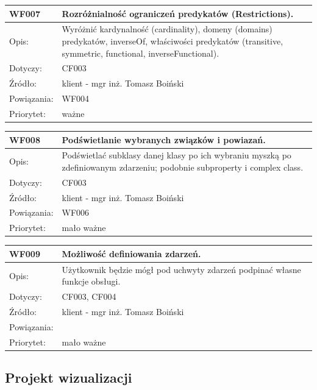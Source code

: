 \documentclass[a4paper,10pt]{article}
\begin{document}
\begin{tabular}{|p{3cm}|p{9cm}|} \hline

WF007 & Rozróżnialność ograniczeń predykatów (Restrictions). \\ \hline
Opis: & Wyróżnić kardynalność (cardinality), domeny (domains) predykatów, inverseOf, właściwości predykatów (transitive, symmetric, functional, inverseFunctional). \\ \hline
Dotyczy: &  CF003\\ \hline
Źródło: &  klient - mgr inż. Tomasz Boiński \\ \hline
Powiązania: & WF004\\ \hline
Priorytet: & ważne \\ \hline

\end{tabular}


\begin{tabular}{|p{3cm}|p{9cm}|} \hline

WF008 &  Podświetlanie wybranych związków i powiazań.\\ \hline
Opis: &   Podświetlać subklasy danej klasy po ich wybraniu myszką po zdefiniowanym zdarzeniu; podobnie subproperty i complex class. \\ \hline
Dotyczy: &  CF003\\ \hline
Źródło: &  klient - mgr inż. Tomasz Boiński \\ \hline
Powiązania: & WF006\\ \hline
Priorytet: & mało ważne \\ \hline

\end{tabular}


\begin{tabular}{|p{3cm}|p{9cm}|} \hline

WF009 & Możliwość definiowania zdarzeń. \\ \hline
Opis: &   Użytkownik będzie mógł pod uchwyty zdarzeń podpinać własne funkcje obsługi. \\ \hline
Dotyczy: & CF003, CF004  \\ \hline
Źródło: & klient - mgr inż. Tomasz Boiński \\ \hline
Powiązania: & \\ \hline
Priorytet: & mało ważne \\ \hline

\end{tabular}


\subsection{Projekt wizualizacji}
 
\end{document}
